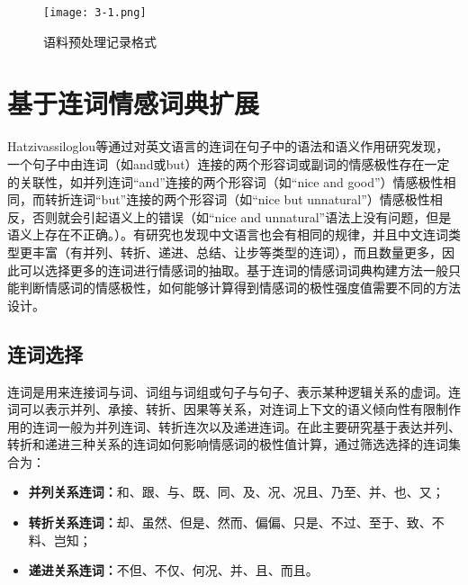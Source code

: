 \begin{figure}[htp]
\centering
\texttt{[image: 3-1.png]}
\caption{语料预处理记录格式}
\label{fig3-1}
\end{figure}

\section{基于连词情感词典扩展}
\label{linkage}
Hatzivassiloglou等通过对英文语言的连词在句子中的语法和语义作用研究发现，一个句子中由连词（如and或but）连接的两个形容词或副词的情感极性存在一定的关联性，如并列连词“and”连接的两个形容词（如“nice and good”）情感极性相同，而转折连词“but”连接的两个形容词（如“nice but unnatural”）情感极性相反，否则就会引起语义上的错误（如“nice and unnatural”语法上没有问题，但是语义上存在不正确。）。有研究也发现中文语言也会有相同的规律，并且中文连词类型更丰富（有并列、转折、递进、总结、让步等类型的连词），而且数量更多，因此可以选择更多的连词进行情感词的抽取。基于连词的情感词词典构建方法一般只能判断情感词的情感极性，如何能够计算得到情感词的极性强度值需要不同的方法设计。

\subsection{连词选择}
连词是用来连接词与词、词组与词组或句子与句子、表示某种逻辑关系的虚词。连词可以表示并列、承接、转折、因果等关系，对连词上下文的语义倾向性有限制作用的连词一般为并列连词、转折连次以及递进连词。在此主要研究基于表达并列、转折和递进三种关系的连词如何影响情感词的极性值计算，通过筛选选择的连词集合为：
\begin{itemize}
\item \textbf{并列关系连词：}和、跟、与、既、同、及、况、况且、乃至、并、也、又；
\item \textbf{转折关系连词：}却、虽然、但是、然而、偏偏、只是、不过、至于、致、不料、岂知；
\item \textbf{递进关系连词：}不但、不仅、何况、并、且、而且。
\end{itemize}

